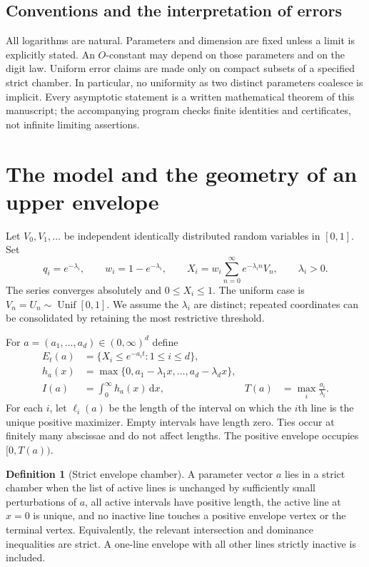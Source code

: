 \documentclass[11pt,a4paper]{article}
\theoremstyle{definition}
\newtheorem{definition}[theorem]{Definition}
\theoremstyle{remark}
\newcommand{\dd}{\,\mathrm d}
\numberwithin{equation}{section}
\begin{document}
\subsection{Conventions and the interpretation of errors}
All logarithms are natural. Parameters and dimension are fixed unless a
limit is explicitly stated. An $O$-constant may depend on those parameters
and on the digit law. Uniform error claims are made only on compact subsets
of a specified strict chamber. In particular, no uniformity as two distinct
parameters coalesce is implicit. Every asymptotic statement is a written
mathematical theorem of this manuscript; the accompanying program checks
finite identities and certificates, not infinite limiting assertions.

\section{The model and the geometry of an upper envelope}
\label{sec:geometry}

Let $V_0,V_1,\ldots$ be independent identically distributed random variables
in $[0,1]$. Set
\begin{equation}
 q_i=e^{-\lambda_i},\qquad w_i=1-e^{-\lambda_i},\qquad
 X_i=w_i\sum_{n=0}^{\infty}e^{-\lambda_i n}V_n,
 \qquad \lambda_i>0.
 \label{eq:model}
\end{equation}
The series converges absolutely and $0\le X_i\le1$. The uniform case is
$V_n=U_n\sim\operatorname{Unif}[0,1]$. We assume the $\lambda_i$ are
distinct; repeated coordinates can be consolidated by retaining the most
restrictive threshold.

For $a=(a_1,\ldots,a_d)\in(0,\infty)^d$ define
\begin{align}
 E_t(a)&=\{X_i\le e^{-a_i t}:1\le i\le d\},\label{eq:event}\\
 h_a(x)&=\max\{0,a_1-\lambda_1x,\ldots,a_d-\lambda_dx\},\label{eq:envelope}\\
 I(a)&=\int_0^\infty h_a(x)\dd x,
 &T(a)&=\max_i\frac{a_i}{\lambda_i}.
 \label{eq:rate}
\end{align}
For each $i$, let $\ell_i(a)$ be the length of the interval on which the
$i$th line is the unique positive maximizer. Empty intervals have length
zero. Ties occur at finitely many abscissae and do not affect lengths.
The positive envelope occupies $[0,T(a))$.

\begin{definition}[Strict envelope chamber]
A parameter vector $a$ lies in a strict chamber when the list of active
lines is unchanged by sufficiently small perturbations of $a$, all active
intervals have positive length, the active line at $x=0$ is unique, and no
inactive line touches a positive envelope vertex or the terminal vertex.
Equivalently, the relevant intersection and dominance inequalities are
strict. A one-line envelope with all other lines strictly inactive is
included.
\end{definition}
\end{document}
